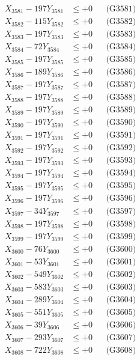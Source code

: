\documentclass[a4paper,10pt]{article}
\begin{document}
{\begin{align}
\allowbreak
X_{3581} - 197Y_{3581} &\leq +0 && \text{(G3581)} \\
X_{3582} - 115Y_{3582} &\leq +0 && \text{(G3582)} \\
X_{3583} - 197Y_{3583} &\leq +0 && \text{(G3583)} \\
X_{3584} - 72Y_{3584} &\leq +0 && \text{(G3584)} \\
X_{3585} - 197Y_{3585} &\leq +0 && \text{(G3585)} \\
X_{3586} - 189Y_{3586} &\leq +0 && \text{(G3586)} \\
X_{3587} - 197Y_{3587} &\leq +0 && \text{(G3587)} \\
X_{3588} - 197Y_{3588} &\leq +0 && \text{(G3588)} \\
X_{3589} - 197Y_{3589} &\leq +0 && \text{(G3589)} \\
X_{3590} - 197Y_{3590} &\leq +0 && \text{(G3590)} \\
\allowbreak
X_{3591} - 197Y_{3591} &\leq +0 && \text{(G3591)} \\
X_{3592} - 197Y_{3592} &\leq +0 && \text{(G3592)} \\
X_{3593} - 197Y_{3593} &\leq +0 && \text{(G3593)} \\
X_{3594} - 197Y_{3594} &\leq +0 && \text{(G3594)} \\
X_{3595} - 197Y_{3595} &\leq +0 && \text{(G3595)} \\
X_{3596} - 197Y_{3596} &\leq +0 && \text{(G3596)} \\
X_{3597} - 34Y_{3597} &\leq +0 && \text{(G3597)} \\
X_{3598} - 197Y_{3598} &\leq +0 && \text{(G3598)} \\
X_{3599} - 197Y_{3599} &\leq +0 && \text{(G3599)} \\
X_{3600} - 76Y_{3600} &\leq +0 && \text{(G3600)} \\
\allowbreak
X_{3601} - 53Y_{3601} &\leq +0 && \text{(G3601)} \\
X_{3602} - 549Y_{3602} &\leq +0 && \text{(G3602)} \\
X_{3603} - 583Y_{3603} &\leq +0 && \text{(G3603)} \\
X_{3604} - 289Y_{3604} &\leq +0 && \text{(G3604)} \\
X_{3605} - 551Y_{3605} &\leq +0 && \text{(G3605)} \\
X_{3606} - 39Y_{3606} &\leq +0 && \text{(G3606)} \\
X_{3607} - 293Y_{3607} &\leq +0 && \text{(G3607)} \\
X_{3608} - 722Y_{3608} &\leq +0 && \text{(G3608)} \\

\end{align}}
\end{document}
